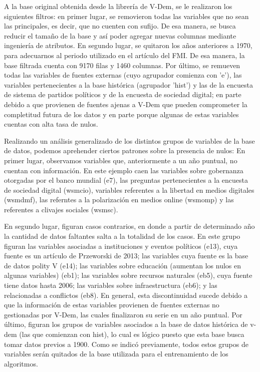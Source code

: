 \documentclass{article}
\begin{document}
A la base original obtenida desde la librería de V-Dem, se le realizaron los
siguientes filtros: en primer lugar, se removieron todas las variables que
no sean las principales, es decir, que no cuenten con sufijo. De esa manera,
se busca reducir el tamaño de la base y así poder agregar nuevas columnas
mediante ingeniería de atributos. En segundo lugar, se quitaron los años 
anteriores a 1970, para adecuarnos al periodo utilizado en el artículo del FMI.
De esa manera, la base filtrada cuenta con 9170 filas y 1460 columnas. Por último,
se remueven todas las variables de fuentes externas (cuyo agrupador comienza con
'e'), las variables pertenecientes a la base histórica (agrupador 'hist') y las
de la encuesta de sistema de partidos políticos y de la encuesta de sociedad digital; 
en parte debido a que provienen
de fuentes ajenas a V-Dem que pueden comprometer la completitud futura de los datos
y en parte porque algunas de estas variables cuentas con alta tasa de nulos.

Realizando un análisis generalizado de los distintos grupos de variables de la base de
datos, podemos aprehender ciertos patrones sobre la presencia de nulos: 
En primer lugar, observamos variables que,
anteriormente a un año puntual, no cuentan con información. En este ejemplo caen
las variables sobre gobernanza otorgadas por el banco mundial (e7), las preguntas
pertenecientes a la encuesta de sociedad digital (wsmcio), variables referentes a
la libertad en medios digitales (wsmdmf), las referntes a la polarización en medios
online (wsmomp) y las referentes a clivajes sociales (wsmsc).

En segundo lugar, figuran casos contrarios, en donde a partir de determinado año
la cantidad de datos faltantes salta a la totalidad de los casos. En este grupo
figuran las variables asociadas a instituciones y eventos políticos (e13), cuya 
fuente es un artículo de Przeworski de 2013; las variables cuya fuente es la base
de datos polity V (e14); las variables sobre educación (aumentan los nulos en 
algunas variables) (eb1); las variables sobre recursos naturales (eb5), cuya fuente 
tiene datos hasta 2006; las variables sobre infraestructura (eb6); y las relacionadas 
a conflictos (eb8). En general, esta discontinuidad sucede debido a que la 
información de estas variables provienen de fuentes externas no gestionadas por 
V-Dem, las cuales finalizaron su serie en un año puntual. Por último, figuran los 
grupos de variables asociados a la base de datos histórica de v-dem (las que comienzan 
con hist), lo cual es lógico puesto que esta base busca tomar datos previos a 1900.
Como se indicó previamente, todos estos grupos de variables serán quitados de la base
utilizada para el entrenamiento de los algoritmos.
\end{document}
